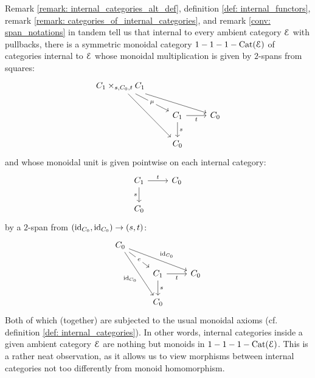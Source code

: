                     \begin{remark} \label{remark: categories_as_monoids}
                        Remark \ref{remark: internal_categories_alt_def}, definition \ref{def: internal_functors}, remark \ref{remark: categories_of_internal_categories}, and remark \ref{conv: span_notations} in tandem tell us that internal to every ambient category $\mathcal{E}$ with pullbacks, there is a symmetric monoidal category $1-1-1-\mathrm{Cat}(\mathcal{E})$ of categories internal to $\mathcal{E}$ whose monoidal multiplication is given by $2$-spans from squares:
                            $$
                                \begin{tikzcd}
                                	{C_1 \x_{s, C_0, t} C_1} \\
                                	& {C_1} & {C_0} \\
                                	& {C_0}
                                	\arrow["s", from=2-2, to=3-2]
                                	\arrow["t"', from=2-2, to=2-3]
                                	\arrow[from=1-1, to=3-2]
                                	\arrow[from=1-1, to=2-3]
                                	\arrow["\mu"{description}, from=1-1, to=2-2]
                                \end{tikzcd}
                            $$
                        and whose monoidal unit is given pointwise on each internal category:
                            $$
                                \begin{tikzcd}
                                	{C_1} & {C_0} \\
                                	{C_0}
                                	\arrow["s"', from=1-1, to=2-1]
                                	\arrow["t", from=1-1, to=1-2]
                                \end{tikzcd}
                            $$
                        by a $2$-span from $(\mathrm{id}_{C_0}, \mathrm{id}_{C_0}) \to (s,t)$:
                            $$
                                \begin{tikzcd}
                                	{C_0} \\
                                	& {C_1} & {C_0} \\
                                	& {C_0}
                                	\arrow["s", from=2-2, to=3-2]
                                	\arrow["t"', from=2-2, to=2-3]
                                	\arrow["e"{description}, from=1-1, to=2-2]
                                	\arrow["{\id_{C_0}}"', from=1-1, to=3-2]
                                	\arrow["{\id_{C_0}}", from=1-1, to=2-3]
                                \end{tikzcd}
                            $$
                        Both of which (together) are subjected to the usual monoidal axioms (cf. definition \ref{def: internal_categories}). In other words, internal categories inside a given ambient category $\mathcal{E}$ are nothing but monoids in $1-1-1-\mathrm{Cat}(\mathcal{E})$. This is a rather neat observation, as it allows us to view morphisms between internal categories not too differently from monoid homomorphism. 
                    \end{remark}
                    
